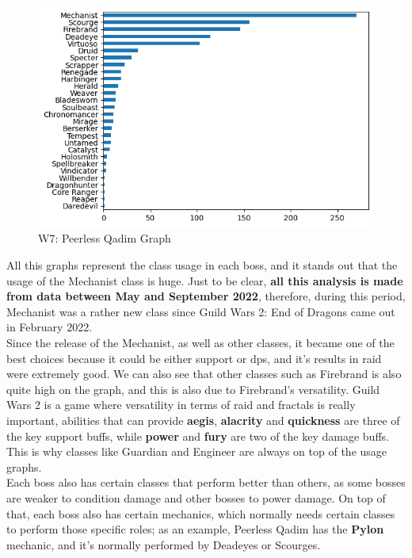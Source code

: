 \documentclass[12pt,a4paper]{article}
\begin{document}
    \begin{figure}
        \centering
        \includegraphics[scale=0.4]{prlqadim_graph.png}
        \caption{\small W7: Peerless Qadim Graph}
    \end{figure}

    All this graphs represent the class usage in each boss, and it stands out that the usage of
    the Mechanist class is huge. Just to be clear, \textbf{all this analysis is made from data 
    between May and September 2022}, therefore, during this period, Mechanist was a rather new 
    class since Guild Wars 2: End of Dragons came out in February 2022.\\

    Since the release of the Mechanist, as well as other classes, it became one of the best choices
    because it could be either support or dps, and it's results in raid were extremely good. We can 
    also see that other classes such as Firebrand is also quite high on the graph, and this is also
    due to Firebrand's versatility. Guild Wars 2 is a game where versatility in terms of raid and 
    fractals is really important, abilities that can provide \textbf{aegis}, \textbf{alacrity} and 
    \textbf{quickness} are three of the key support buffs, while \textbf{power} and \textbf{fury}
    are two of the key damage buffs. This is why classes like Guardian and Engineer are always on 
    top of the usage graphs.\\

    Each boss also has certain classes that perform better than others, as some bosses are weaker to
    condition damage and other bosses to power damage. On top of that, each boss also has certain
    mechanics, which normally needs certain classes to perform those specific roles; as an example,
    Peerless Qadim has the \textbf{Pylon} mechanic, and it's normally performed by Deadeyes or Scourges.
\end{document}

